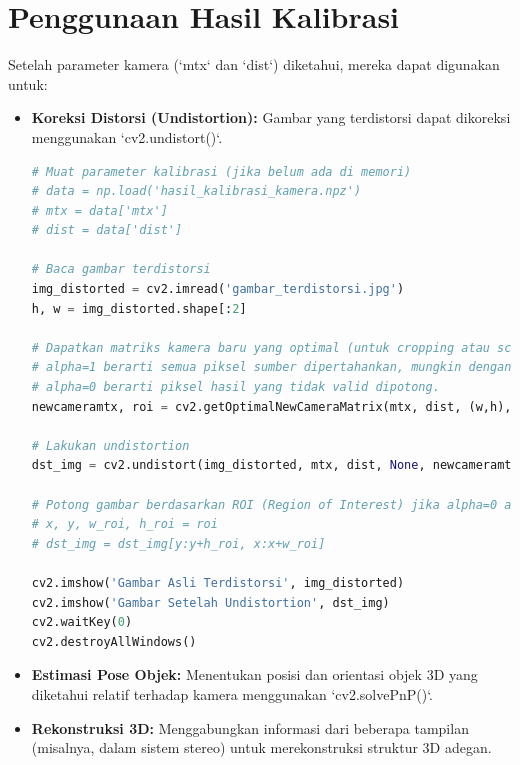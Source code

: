\documentclass[12pt,a4paper]{article}
\begin{document}
\section{Penggunaan Hasil Kalibrasi}
Setelah parameter kamera (`mtx` dan `dist`) diketahui, mereka dapat digunakan
untuk:
\begin{itemize}
    \item \textbf{Koreksi Distorsi (Undistortion):}
          Gambar yang terdistorsi dapat dikoreksi menggunakan `cv2.undistort()`.
          \begin{lstlisting}[caption=Contoh Undistortion, language=Python]
# Muat parameter kalibrasi (jika belum ada di memori)
# data = np.load('hasil_kalibrasi_kamera.npz')
# mtx = data['mtx']
# dist = data['dist']

# Baca gambar terdistorsi
img_distorted = cv2.imread('gambar_terdistorsi.jpg')
h, w = img_distorted.shape[:2]

# Dapatkan matriks kamera baru yang optimal (untuk cropping atau scaling)
# alpha=1 berarti semua piksel sumber dipertahankan, mungkin dengan piksel hitam tambahan.
# alpha=0 berarti piksel hasil yang tidak valid dipotong.
newcameramtx, roi = cv2.getOptimalNewCameraMatrix(mtx, dist, (w,h), 1, (w,h))

# Lakukan undistortion
dst_img = cv2.undistort(img_distorted, mtx, dist, None, newcameramtx)

# Potong gambar berdasarkan ROI (Region of Interest) jika alpha=0 atau untuk menghilangkan piksel hitam
# x, y, w_roi, h_roi = roi
# dst_img = dst_img[y:y+h_roi, x:x+w_roi]

cv2.imshow('Gambar Asli Terdistorsi', img_distorted)
cv2.imshow('Gambar Setelah Undistortion', dst_img)
cv2.waitKey(0)
cv2.destroyAllWindows()
    \end{lstlisting}
    \item \textbf{Estimasi Pose Objek:} Menentukan posisi dan orientasi objek 3D yang diketahui relatif terhadap kamera menggunakan `cv2.solvePnP()`.
    \item \textbf{Rekonstruksi 3D:} Menggabungkan informasi dari beberapa tampilan (misalnya, dalam sistem stereo) untuk merekonstruksi struktur 3D adegan.
\end{itemize}
\end{document}
